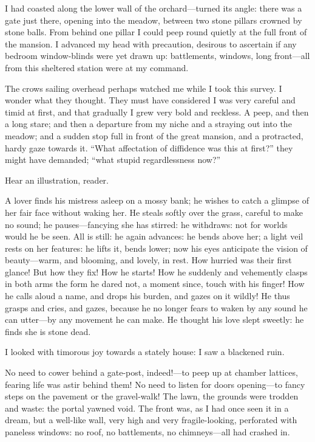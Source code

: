 I had coasted along the lower wall of the orchard---turned its angle:
there was a gate just there, opening into the meadow, between two stone
pillars crowned by stone balls. From behind one pillar I could peep
round quietly at the full front of the mansion. I advanced my head with
precaution, desirous to ascertain if any bedroom window-blinds were yet
drawn up: battlements, windows, long front---all from this sheltered
station were at my command.

The crows sailing overhead perhaps watched me while I took this survey. 
I wonder what they thought. They must have considered I was very
careful and timid at first, and that gradually I grew very bold and
reckless. A peep, and then a long stare; and then a departure from my
niche and a straying out into the meadow; and a sudden stop full in
front of the great mansion, and a protracted, hardy gaze towards it. 
\enquote{What affectation of diffidence was this at first?} they might
have demanded; \enquote{what stupid regardlessness now?}

Hear an illustration, reader.

A lover finds his mistress asleep on a mossy bank; he wishes to catch a
glimpse of her fair face without waking her. He steals softly over the
grass, careful to make no sound; he pauses---fancying she has stirred:
he withdraws: not for worlds would he be seen. All is still: he again
advances: he bends above her; a light veil rests on her features: he
lifts it, bends lower; now his eyes anticipate the vision of
beauty---warm, and blooming, and lovely, in rest. How hurried was their
first glance! But how they fix! How he starts! How he suddenly and
vehemently clasps in both arms the form he dared not, a moment since,
touch with his finger! How he calls aloud a name, and drops his burden,
and gazes on it wildly! He thus grasps and cries, and gazes, because he
no longer fears to waken by any sound he can utter---by any movement he
can make. He thought his love slept sweetly: he finds she is stone
dead.

I looked with timorous joy towards a stately house: I saw a blackened
ruin.

No need to cower behind a gate-post, indeed!---to peep up at chamber
lattices, fearing life was astir behind them! No need to listen for
doors opening---to fancy steps on the pavement or the gravel-walk! The
lawn, the grounds were trodden and waste: the portal yawned void. The
front was, as I had once seen it in a dream, but a well-like wall, very
high and very fragile-looking, perforated with paneless windows: no
roof, no battlements, no chimneys---all had crashed in.

